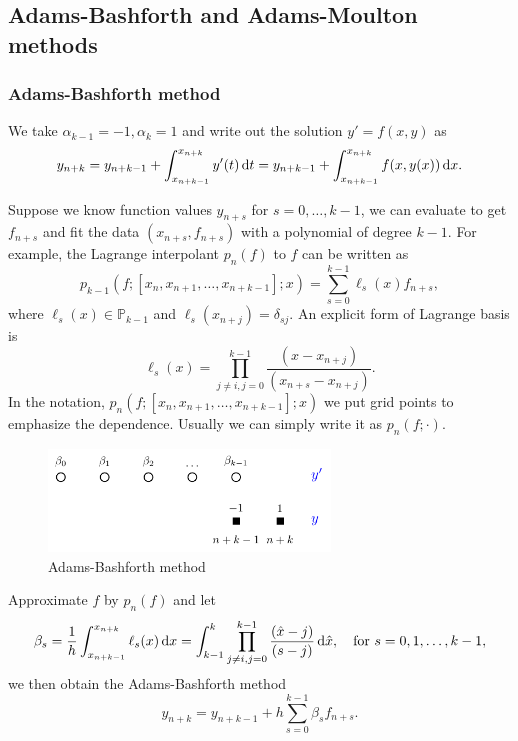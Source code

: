 \documentclass[10pt]{amsart}
\begin{document}
\subsection{Adams-Bashforth and Adams-Moulton methods}

\subsubsection{Adams-Bashforth method}
We take $\alpha_{k-1} = -1, \alpha_{k} = 1$ and write out the  solution $y' = f(x, y)$ as
\begin{equation}
y_{n+k} = y_{n+k-1} + \int_{x_{n+k-1}}^{x_{n+k}} y'(t)\,{\rm d} t = y_{n+k-1} + \int_{x_{n+k-1}}^{x_{n+k}} f(x, y(x))\,{\rm d}x.
\end{equation}

Suppose we know function values $y_{n+s}$ for $s =0,\ldots, k-1$, we can evaluate to get $f_{n+s}$ and fit the data $(x_{n+s}, f_{n+s})$ with a polynomial of degree $k-1$. For example, the Lagrange interpolant $p_n(f)$ to $f$ can be written as 
$$
p_{k-1}(f; [x_{n}, x_{n+1}, \ldots, x_{n+k-1}]; x) = \sum_{s=0}^{k-1}\ell_s(x) f_{n+s},
$$
where $\ell_s(x)\in \mathbb P_{k-1}$ and $\ell_s(x_{n+j}) = \delta_{s j}$. An explicit form of Lagrange basis is
$$
\ell_s(x) = \prod_{j\neq i, j=0}^{k-1} \frac{(x - x_{n+j})}{(x_{n+s} - x_{n+j})}.
$$
In the notation, $p_n(f; [x_{n}, x_{n+1}, \ldots, x_{n+k-1}]; x)$ we put grid points to emphasize the dependence. Usually we can simply write it as $p_n(f;\cdot)$. 

\begin{figure}[htbp]
\begin{center}
\includegraphics[width=7.5cm]{figures/ABmethod.pdf}
\caption{Adams-Bashforth method}
\label{fig:multistep}
\end{center}
\end{figure}

Approximate $f$ by $p_n(f)$ and let 
$$
\beta_s = \frac{1}{h}\int_{x_{n+k-1}}^{x_{n+k}} \ell_s(x) \,{\rm d}x = \int_{k-1}^k \prod_{j\neq i, j=0}^{k-1} \frac{ (\hat x -j)}{(s - j)}\,{\rm d} \hat x, \quad \text{for } s =0, 1, \ldots, k-1,
$$ we then obtain the Adams-Bashforth method
\begin{equation}
y_{n+k} = y_{n+k-1} + h \sum_{s=0}^{k-1}\beta_s f_{n+s}.
\end{equation}
\end{document}
